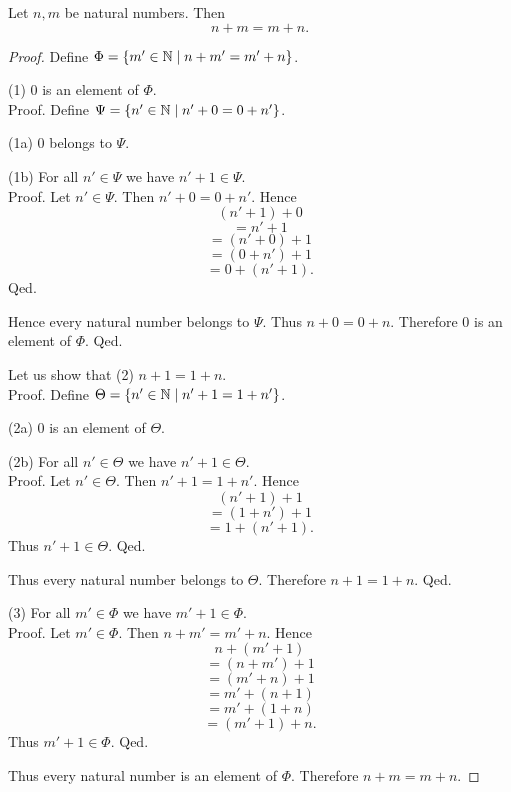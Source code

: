 \documentclass[10pt]{article}
\begin{document}
  \begin{forthel}
    \begin{proposition}
      Let $n, m$ be natural numbers.
      Then \[ n + m = m + n. \]
    \end{proposition}
    \begin{proof}
      Define $\Phi = \{ m' \in \mathbb{N} \mid n + m' = m' + n \}$.

      (1) $0$ is an element of $\Phi$. \\
      Proof.
        Define $\Psi = \{ n' \in \mathbb{N} \mid n' + 0 = 0 + n' \}$.

        (1a) $0$ belongs to $\Psi$.

        (1b) For all $n' \in \Psi$ we have $n' + 1 \in \Psi$. \\
        Proof.
          Let $n' \in \Psi$.
          Then $n' + 0 = 0 + n'$.
          Hence
          \[  (n' + 1) + 0        \]
          \[    = n' + 1          \]
          \[    = (n' + 0) + 1    \]
          \[    = (0 + n') + 1    \]
          \[    = 0 + (n' + 1).   \]
        Qed.

        Hence every natural number belongs to $\Psi$.
        Thus $n + 0 = 0 + n$.
        Therefore $0$ is an element of $\Phi$.
      Qed.

      Let us show that (2) $n + 1 = 1 + n$. \\
      Proof.
        Define $\Theta = \{ n' \in \mathbb{N} \mid n' + 1 = 1 + n' \}$.

        (2a) $0$ is an element of $\Theta$.

        (2b) For all $n' \in \Theta$ we have $n' + 1 \in \Theta$. \\
        Proof.
          Let $n' \in \Theta$.
          Then $n' + 1 = 1 + n'$.
          Hence
          \[  (n' + 1) + 1        \]
          \[    = (1 + n') + 1    \]
          \[    = 1 + (n' + 1).   \]
          Thus $n' + 1 \in \Theta$.
        Qed.

        Thus every natural number belongs to $\Theta$.
        Therefore $n + 1 = 1 + n$.
      Qed.

      (3) For all $m' \in \Phi$ we have $m' + 1 \in \Phi$. \\
      Proof.
        Let $m' \in \Phi$.
        Then $n + m' = m' + n$.
        Hence
        \[  n + (m'  + 1)       \]
        \[    = (n + m') + 1    \]
        \[    = (m' + n) + 1    \]
        \[    = m' + (n + 1)    \]
        \[    = m' + (1 + n)    \]
        \[    = (m' + 1) + n.   \]
        Thus $m' + 1 \in \Phi$.
      Qed.

      Thus every natural number is an element of $\Phi$.
      Therefore $n + m = m + n$.
    \end{proof}
  \end{forthel}
\end{document}

